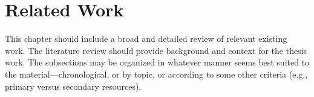 \chapter{Related Work} 
\label{ch:relatedwork}

This chapter should include a broad and detailed review of relevant existing work. The literature review should provide background and context for the thesis work. The subsections may be organized in whatever
manner seems best suited to the material---chronological, or by topic, or
according to some other criteria (e.g., primary versus secondary resources).

